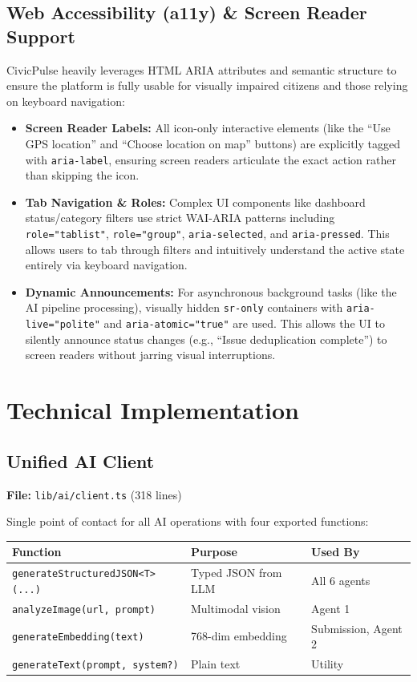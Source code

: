 \documentclass[11pt,a4paper]{article}
\newcommand{\thead}[1]{{\color{white}\bfseries\sffamily #1}}
\newcommand{\tech}[1]{\texttt{\color{cpteal}#1}}
\newcommand{\file}[1]{\texttt{\footnotesize\color{cpgray}#1}}
\begin{document}
\subsection{Web Accessibility (a11y) \& Screen Reader Support}
CivicPulse heavily leverages HTML ARIA attributes and semantic structure to ensure the platform is fully usable for visually impaired citizens and those relying on keyboard navigation:
\begin{itemize}
  \item \textbf{Screen Reader Labels:} All icon-only interactive elements (like the ``Use GPS location'' and ``Choose location on map'' buttons) are explicitly tagged with \tech{aria-label}, ensuring screen readers articulate the exact action rather than skipping the icon.
  \item \textbf{Tab Navigation \& Roles:} Complex UI components like dashboard status/category filters use strict WAI-ARIA patterns including \tech{role="tablist"}, \tech{role="group"}, \tech{aria-selected}, and \tech{aria-pressed}. This allows users to tab through filters and intuitively understand the active state entirely via keyboard navigation.
  \item \textbf{Dynamic Announcements:} For asynchronous background tasks (like the AI pipeline processing), visually hidden \tech{sr-only} containers with \tech{aria-live="polite"} and \tech{aria-atomic="true"} are used. This allows the UI to silently announce status changes (e.g., ``Issue deduplication complete'') to screen readers without jarring visual interruptions.
\end{itemize}
\clearpage

\section{Technical Implementation}
\label{sec:technical}

\subsection{Unified AI Client}
\textbf{File:} \file{lib/ai/client.ts} (318 lines)

Single point of contact for all AI operations with four exported functions:

\begin{tabular}{@{} L{5.5cm} L{4cm} L{4cm} @{}}
\toprule
{}
\thead{Function} & \thead{Purpose} & \thead{Used By} \\
\midrule
\tech{generateStructuredJSON<T>(...)} & Typed JSON from LLM & All 6 agents \\
\tech{analyzeImage(url, prompt)} & Multimodal vision & Agent 1 \\
\tech{generateEmbedding(text)} & 768-dim embedding & Submission, Agent 2 \\
\tech{generateText(prompt, system?)} & Plain text & Utility \\
\bottomrule
\end{tabular}
\end{document}
